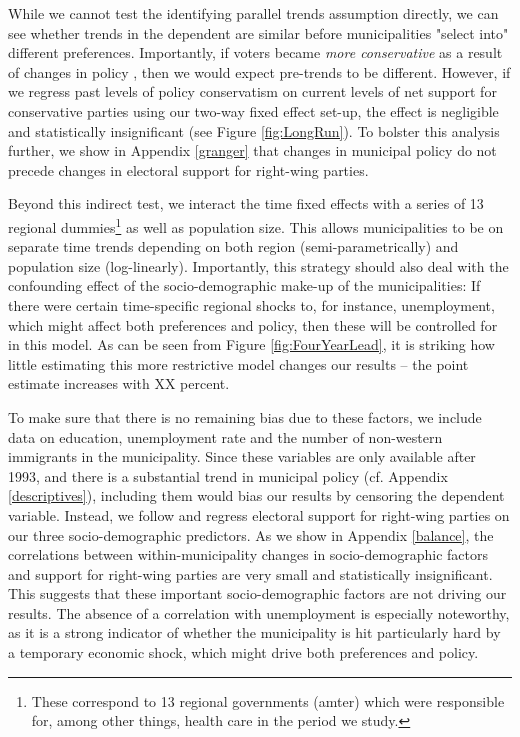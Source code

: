 \documentclass[a4paper,12pt]{article}
\begin{document}
While we cannot test the identifying parallel trends assumption directly, we can see whether trends in the dependent are similar before municipalities "select into" different preferences. Importantly, if voters became \emph{more conservative} as a result of changes in policy \cite[cf.][]{lenz2013follow,slothuus2010can}, then we would expect pre-trends to be different. However, if we regress past levels of policy conservatism on current levels of net support for conservative parties using our two-way fixed effect set-up, the effect is negligible and statistically insignificant (see Figure \ref{fig:LongRun}). To  bolster this analysis further,  we show in Appendix \ref{granger} that changes in municipal policy do not precede changes in electoral support for right-wing parties.

Beyond this indirect test,  we interact the time fixed effects with a series of 13 regional dummies\footnote{These correspond to  13 regional governments (amter) which were responsible for, among other things, health care in the period we study.} as well as population size. This allows municipalities to be on separate time trends depending on both region (semi-parametrically) and population size (log-linearly). Importantly, this strategy should also deal with the confounding effect of the socio-demographic make-up of the municipalities: If there were certain time-specific regional shocks to, for instance, unemployment, which might affect both preferences and policy, then these will be controlled for in this model. As can be seen from Figure \ref{fig:FourYearLead}, it is striking how little estimating this more restrictive model changes our results -- the point estimate increases with XX percent.

To make sure that there is no remaining bias due to these factors, we include data on education, unemployment rate and the number of non-western immigrants in the municipality. Since these variables are only available after 1993, and there is a substantial trend in municipal policy (cf. Appendix \ref{descriptives}), including them would bias our results by censoring the dependent variable. Instead, we follow \citep{pei2018poorly} and regress electoral support for right-wing parties on our three socio-demographic predictors. As we show in Appendix \ref{balance}, the correlations between within-municipality changes in socio-demographic factors and support for right-wing parties are very small and statistically insignificant. This suggests that these important socio-demographic factors are not driving our results. The absence of a correlation with unemployment is especially noteworthy, as it is a strong indicator of whether the municipality is hit particularly hard by a temporary economic shock, which might drive both preferences and policy.
\end{document}
